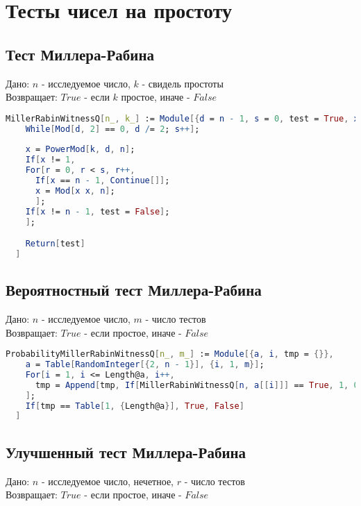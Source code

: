 \section{Тесты чисел на простоту}

\subsection{Тест Миллера-Рабина}

  Дано: {$n$} - исследуемое число, {$k$} - свидель простоты \\
  Возвращает: {$True$} - если {$k$} простое, иначе - {$False$}

\begin{lstlisting}[language=Mathematica,caption={Тест Миллера-Рабина}]
  MillerRabinWitnessQ[n_, k_] := Module[{d = n - 1, s = 0, test = True, x, a, r},
    While[Mod[d, 2] == 0, d /= 2; s++];
    
    x = PowerMod[k, d, n];
    If[x != 1,
    For[r = 0, r < s, r++,
      If[x == n - 1, Continue[]];
      x = Mod[x x, n];
      ];
    If[x != n - 1, test = False];
    ];

    Return[test]
  ]
\end{lstlisting}

\subsection{Вероятностный тест Миллера-Рабина}

  Дано: {$n$} - исследуемое число, {$m$} - число тестов \\
  Возвращает: {$True$} - если простое, иначе - {$False$}

\begin{lstlisting}[language=Mathematica,caption={Вероятностный тест Миллера-Рабина}]
  ProbabilityMillerRabinWitnessQ[n_, m_] := Module[{a, i, tmp = {}},
    a = Table[RandomInteger[{2, n - 1}], {i, 1, m}];
    For[i = 1, i <= Length@a, i++,
      tmp = Append[tmp, If[MillerRabinWitnessQ[n, a[[i]]] == True, 1, 0]];
    ];
    If[tmp == Table[1, {Length@a}], True, False]
  ] 
\end{lstlisting}

\subsection{Улучшенный тест Миллера-Рабина}

  Дано: {$n$} - исследуемое число, нечетное, {$r$} - число тестов \\
  Возвращает: {$True$} - если простое, иначе - {$False$}

